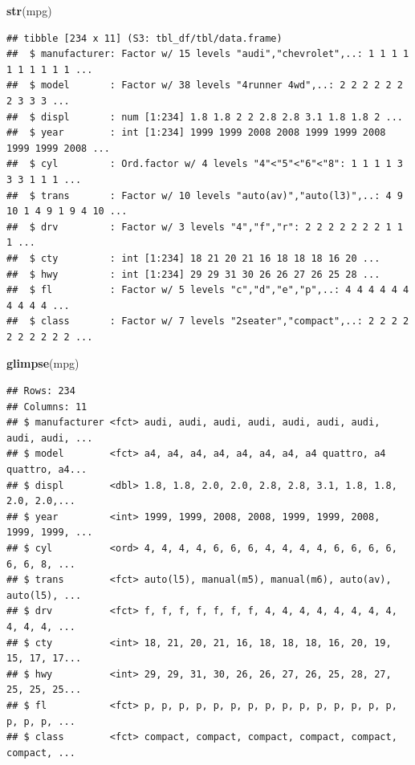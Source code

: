 \documentclass[]{tufte-book}
\newenvironment{Shaded}{}{}
\newcommand{\KeywordTok}[1]{\textcolor[rgb]{0.00,0.44,0.13}{\textbf{#1}}}
\newcommand{\NormalTok}[1]{#1}
\begin{document}
\begin{Shaded}
\begin{Highlighting}[]
\KeywordTok{str}\NormalTok{(mpg)}
\end{Highlighting}
\end{Shaded}

\begin{verbatim}
## tibble [234 x 11] (S3: tbl_df/tbl/data.frame)
##  $ manufacturer: Factor w/ 15 levels "audi","chevrolet",..: 1 1 1 1 1 1 1 1 1 1 ...
##  $ model       : Factor w/ 38 levels "4runner 4wd",..: 2 2 2 2 2 2 2 3 3 3 ...
##  $ displ       : num [1:234] 1.8 1.8 2 2 2.8 2.8 3.1 1.8 1.8 2 ...
##  $ year        : int [1:234] 1999 1999 2008 2008 1999 1999 2008 1999 1999 2008 ...
##  $ cyl         : Ord.factor w/ 4 levels "4"<"5"<"6"<"8": 1 1 1 1 3 3 3 1 1 1 ...
##  $ trans       : Factor w/ 10 levels "auto(av)","auto(l3)",..: 4 9 10 1 4 9 1 9 4 10 ...
##  $ drv         : Factor w/ 3 levels "4","f","r": 2 2 2 2 2 2 2 1 1 1 ...
##  $ cty         : int [1:234] 18 21 20 21 16 18 18 18 16 20 ...
##  $ hwy         : int [1:234] 29 29 31 30 26 26 27 26 25 28 ...
##  $ fl          : Factor w/ 5 levels "c","d","e","p",..: 4 4 4 4 4 4 4 4 4 4 ...
##  $ class       : Factor w/ 7 levels "2seater","compact",..: 2 2 2 2 2 2 2 2 2 2 ...
\end{verbatim}

\begin{Shaded}
\begin{Highlighting}[]
\KeywordTok{glimpse}\NormalTok{(mpg)}
\end{Highlighting}
\end{Shaded}

\begin{verbatim}
## Rows: 234
## Columns: 11
## $ manufacturer <fct> audi, audi, audi, audi, audi, audi, audi, audi, audi, ...
## $ model        <fct> a4, a4, a4, a4, a4, a4, a4, a4 quattro, a4 quattro, a4...
## $ displ        <dbl> 1.8, 1.8, 2.0, 2.0, 2.8, 2.8, 3.1, 1.8, 1.8, 2.0, 2.0,...
## $ year         <int> 1999, 1999, 2008, 2008, 1999, 1999, 2008, 1999, 1999, ...
## $ cyl          <ord> 4, 4, 4, 4, 6, 6, 6, 4, 4, 4, 4, 6, 6, 6, 6, 6, 6, 8, ...
## $ trans        <fct> auto(l5), manual(m5), manual(m6), auto(av), auto(l5), ...
## $ drv          <fct> f, f, f, f, f, f, f, 4, 4, 4, 4, 4, 4, 4, 4, 4, 4, 4, ...
## $ cty          <int> 18, 21, 20, 21, 16, 18, 18, 18, 16, 20, 19, 15, 17, 17...
## $ hwy          <int> 29, 29, 31, 30, 26, 26, 27, 26, 25, 28, 27, 25, 25, 25...
## $ fl           <fct> p, p, p, p, p, p, p, p, p, p, p, p, p, p, p, p, p, p, ...
## $ class        <fct> compact, compact, compact, compact, compact, compact, ...
\end{verbatim}
\end{document}
